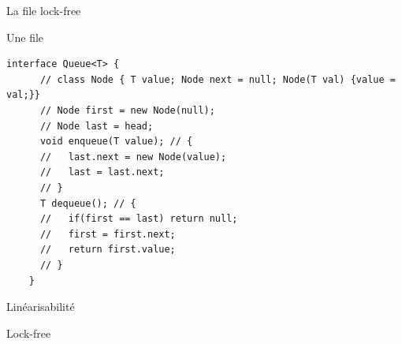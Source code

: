 
\begingroup

\begin{frame}[fragile]{La file lock-free}

  \begin{description}
  \item[Spécification séquentielle :] Une file
  \end{description}

  \begin{lstlisting}[gobble=4]
    interface Queue<T> {
      // class Node { T value; Node next = null; Node(T val) {value = val;}}
      // Node first = new Node(null);
      // Node last = head;
      void enqueue(T value); // {
      //   last.next = new Node(value);
      //   last = last.next;
      // }
      T dequeue(); // {
      //   if(first == last) return null;
      //   first = first.next;
      //   return first.value;
      // }
    }
  \end{lstlisting}

  \begin{description}
  \item[Critère de cohérence :] Linéarisabilité
  \item[Condition de progression :] Lock-free
  \end{description}
  
  
\end{frame}

\endgroup
\endinput

